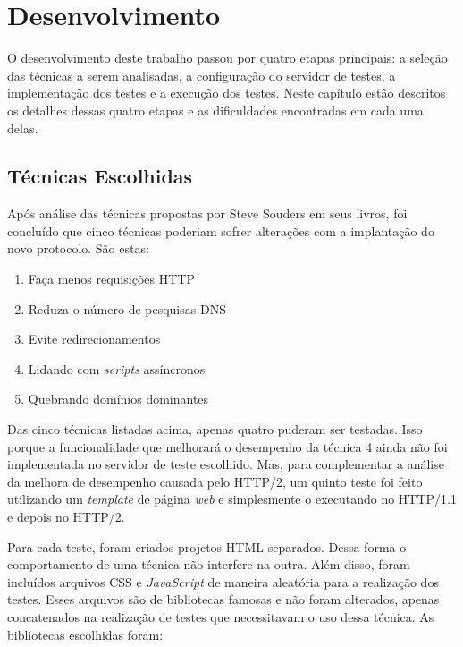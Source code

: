 %
%

\chapter{Desenvolvimento}

O desenvolvimento deste trabalho passou por quatro etapas principais: a seleção das técnicas a serem analisadas, a configuração do servidor de testes, a implementação dos testes e a execução dos testes. Neste capítulo estão descritos os detalhes dessas quatro etapas e as dificuldades encontradas em cada uma delas.

\section{Técnicas Escolhidas}
\label{tecnicasescolhidas}

Após análise das técnicas propostas por Steve Souders em seus livros, foi concluído que cinco técnicas poderiam sofrer alterações com a implantação do novo protocolo. São estas:

\begin{enumerate}
	\item Faça menos requisições HTTP
	\item Reduza o número de pesquisas DNS
	\item Evite redirecionamentos
	\item Lidando com \textit{scripts} assíncronos
	\item Quebrando domínios dominantes
\end{enumerate}

Das cinco técnicas listadas acima, apenas quatro puderam ser testadas. Isso porque a funcionalidade que melhorará o desempenho da técnica 4 ainda não foi implementada no servidor de teste escolhido. Mas, para complementar a análise da melhora de desempenho causada pelo HTTP/2, um quinto teste foi feito utilizando um \textit{template} de página \textit{web} e simplesmente o executando no HTTP/1.1 e depois no HTTP/2.

Para cada teste, foram criados projetos HTML separados. Dessa forma o comportamento de uma técnica não interfere na outra. Além disso, foram incluídos arquivos CSS e \textit{JavaScript} de maneira aleatória para a realização dos testes. Esses arquivos são de bibliotecas famosas e não foram alterados, apenas concatenados na realização de testes que necessitavam o uso dessa técnica. As bibliotecas escolhidas foram:

